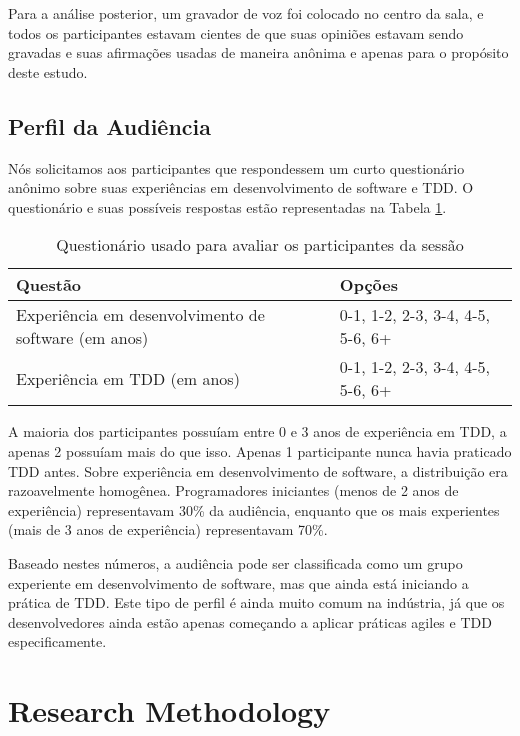 Para a análise posterior, um gravador de voz foi colocado no centro
da sala, e todos os participantes estavam cientes de que suas opiniões
estavam sendo gravadas e suas afirmações usadas de maneira anônima e apenas
para o propósito deste estudo.

\subsection{Perfil da Audiência}
\label{motiv:sec:participants}

Nós solicitamos aos participantes que respondessem um curto questionário anônimo
sobre suas experiências em desenvolvimento de software e TDD.
O questionário e suas possíveis respostas estão representadas
na Tabela \ref{motiv:questionnaire}.

\begin{center}
\begin{table}[h]
\centering
\begin{tabular}{ | p{5.5cm} || p{5.5cm} | }
\hline
Questão & Opções
\\ \hline \hline
Experiência em desenvolvimento de software (em anos) &
0-1, 1-2, 2-3, 3-4, 4-5, 5-6, 6+\hspace{0.1cm}
\\ \hline
Experiência em TDD (em anos) &
0-1, 1-2, 2-3, 3-4, 4-5, 5-6, 6+
\\ \hline
\end{tabular}
\caption{Questionário usado para avaliar os participantes da sessão}
\label{motiv:questionnaire}
\end{table}
\end{center}

A maioria dos participantes possuíam entre 0 e 3 anos de experiência em TDD,
a apenas 2 possuíam mais do que isso. Apenas 1 participante nunca havia
praticado TDD antes.
Sobre experiência em desenvolvimento de software, a distribuição era
razoavelmente homogênea. Programadores iniciantes (menos de 2 anos de experiência)
representavam 30\% da audiência, enquanto que os mais experientes (mais de 3 anos de experiência)
representavam 70\%.

Baseado nestes números, a audiência pode ser classificada como um grupo
experiente em desenvolvimento de software, mas que ainda está iniciando
a prática de TDD. Este tipo de perfil é ainda muito comum na indústria,
já que os desenvolvedores ainda estão apenas começando a aplicar práticas
agiles e TDD especificamente.

\section{Research Methodology}

